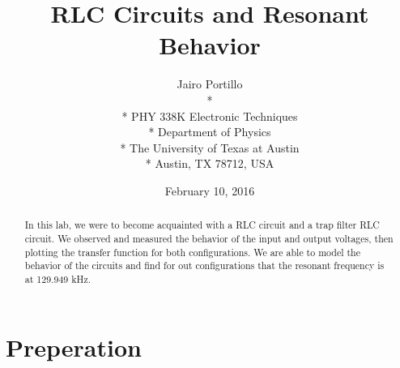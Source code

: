 \documentclass[11pt,letterpaper,onecolumn]{article}
\begin{document}

\title{\bf RLC Circuits and Resonant Behavior}

\author{
 Jairo Portillo \\*
  \\*
 PHY 338K Electronic Techniques \\*
 Department of Physics \\*
 The University of Texas at Austin \\*
 Austin, TX 78712, USA
}
\date{February 10, 2016}


\maketitle


\begin{abstract}

In this lab, we were to become acquainted with a RLC circuit and a trap filter RLC circuit. We observed and measured the behavior of the input and output voltages, then plotting the transfer function for both configurations. We are able to model the behavior of the circuits and find for out configurations that the resonant frequency is at 129.949 kHz.     
\end{abstract}



\section{Preperation}
\end{document}
